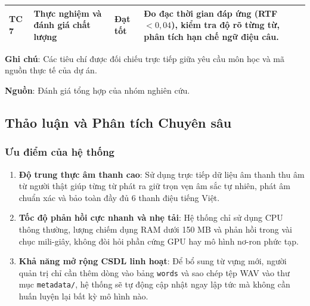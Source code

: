 \begin{table}[H]
\begin{tabularx}{\textwidth}{p{1.2cm}p{4.6cm}p{2.4cm}X}
\addlinespace
TC 7 & Thực nghiệm và đánh giá chất lượng & Đạt tốt & Đo đạc thời gian đáp ứng (RTF $< 0{,}04$), kiểm tra độ rõ từng từ, phân tích hạn chế ngữ điệu câu. \\
\bottomrule
\end{tabularx}
\par\vspace{4pt}
\begin{minipage}{\textwidth}
\fontsize{12}{14}\selectfont \textbf{Ghi chú}: Các tiêu chí được đối chiếu trực tiếp giữa yêu cầu môn học và mã nguồn thực tế của dự án.\par
\textbf{Nguồn}: Đánh giá tổng hợp của nhóm nghiên cứu.
\end{minipage}
\end{table}

\subsection{Thảo luận và Phân tích Chuyên sâu}

\subsubsection{Ưu điểm của hệ thống}
\begin{enumerate}
    \item \textbf{Độ trung thực âm thanh cao}: Sử dụng trực tiếp dữ liệu âm thanh thu âm từ người thật giúp từng từ phát ra giữ trọn vẹn âm sắc tự nhiên, phát âm chuẩn xác và bảo toàn đầy đủ 6 thanh điệu tiếng Việt.
    \item \textbf{Tốc độ phản hồi cực nhanh và nhẹ tải}: Hệ thống chỉ sử dụng CPU thông thường, lượng chiếm dụng RAM dưới 150 MB và phản hồi trong vài chục mili-giây, không đòi hỏi phần cứng GPU hay mô hình nơ-ron phức tạp.
    \item \textbf{Khả năng mở rộng CSDL linh hoạt}: Để bổ sung từ vựng mới, người quản trị chỉ cần thêm dòng vào bảng \texttt{words} và sao chép tệp WAV vào thư mục \texttt{metadata/}, hệ thống sẽ tự động cập nhật ngay lập tức mà không cần huấn luyện lại bất kỳ mô hình nào.
\end{enumerate}

